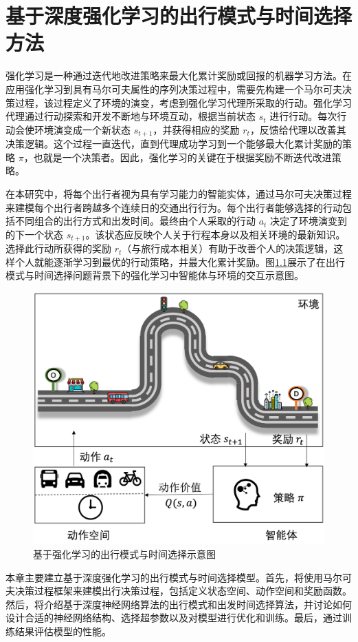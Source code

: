 \chapter{基于深度强化学习的出行模式与时间选择方法}
\label{chp:float}

强化学习是一种通过迭代地改进策略来最大化累计奖励或回报的机器学习方法。在应用强化学习到具有马尔可夫属性的序列决策过程中，需要先构建一个马尔可夫决策过程，该过程定义了环境的演变，考虑到强化学习代理所采取的行动。强化学习代理通过行动探索和开发不断地与环境互动，根据当前状态 $s_t$ 进行行动。每次行动会使环境演变成一个新状态 $s_{t+1}$，并获得相应的奖励 $r_t$，反馈给代理以改善其决策逻辑。这个过程一直迭代，直到代理成功学习到一个能够最大化累计奖励的策略 $\pi$，也就是一个决策者。因此，强化学习的关键在于根据奖励不断迭代改进策略。

在本研究中，将每个出行者视为具有学习能力的智能实体，通过马尔可夫决策过程来建模每个出行者跨越多个连续日的交通出行行为。每个出行者能够选择的行动包括不同组合的出行方式和出发时间。最终由个人采取的行动 $a_t$ 决定了环境演变到的下一个状态 $s_{t+1}$。该状态应反映个人关于行程本身以及相关环境的最新知识。选择此行动所获得的奖励 $r_t$（与旅行成本相关）有助于改善个人的决策逻辑，这样个人就能逐渐学习到最优的行动策略，并最大化累计奖励。图\ref{RLintro}展示了在出行模式与时间选择问题背景下的强化学习中智能体与环境的交互示意图。

\begin{figure}[H]
  \centering
  \includegraphics[width=.65\linewidth]{figures/content/RLintro.png}
  \caption{基于强化学习的出行模式与时间选择示意图}
  \label{RLintro}
\end{figure}

本章主要建立基于深度强化学习的出行模式与时间选择模型。首先，将使用马尔可夫决策过程框架来建模出行决策过程，包括定义状态空间、动作空间和奖励函数。然后，将介绍基于深度神经网络算法的出行模式和出发时间选择算法，并讨论如何设计合适的神经网络结构、选择超参数以及对模型进行优化和训练。最后，通过训练结果评估模型的性能。

